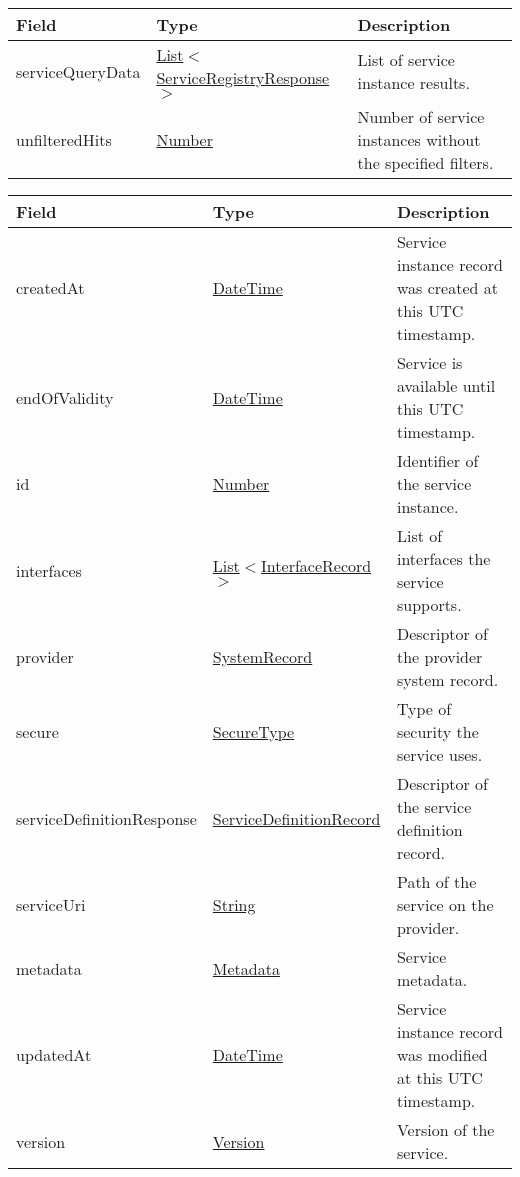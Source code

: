 \documentclass[a4paper]{arrowhead}
\newcommand{\pref}[1]{{\textcolor{ArrowheadGrey}{\hyperref[sec:model:primitives:#1]{#1}}}}
\begin{document}
\label{sec:model:ServiceQueryResult}

\begin{table}[ht!]
\begin{tabularx}{\textwidth}{| p{3cm} | p{6cm} | X |} \hline
\rowcolor{gray!33} Field & Type      & Description \\ \hline
serviceQueryData & \pref{List}$<$\hyperref[sec:model:ServiceRegistryResponse]{ServiceRegistryResponse}$>$     & List of service instance results. \\ \hline
unfilteredHits & \pref{Number} & Number of service instances without the specified filters. \\ \hline
\end{tabularx}
\end{table}

\label{sec:model:ServiceRegistryResponse}

\begin{table}[ht!]
\begin{tabularx}{\textwidth}{| p{4.25cm} | p{4cm} | X |} \hline
\rowcolor{gray!33} Field & Type      & Description \\ \hline
createdAt & \pref{DateTime} & Service instance record was created at this UTC timestamp. \\ \hline
endOfValidity & \pref{DateTime} & Service is available until this UTC timestamp. \\ \hline
id & \pref{Number} & Identifier of the service instance. \\ \hline
interfaces & \pref{List}$<$\hyperref[sec:model:InterfaceRecord]{InterfaceRecord}$>$ & List of interfaces the service supports. \\ \hline
provider & \hyperref[sec:model:SystemRecord]{SystemRecord} & Descriptor of the provider system record. \\ \hline
secure &\pref{SecureType}  & Type of security the service uses. \\ \hline
serviceDefinitionResponse & \hyperref[sec:model:ServiceDefinitionRecord]{ServiceDefinitionRecord} & Descriptor of the service definition record. \\ \hline
serviceUri & \pref{String} & Path of the service on the provider. \\ \hline
metadata & \hyperref[sec:model:Metadata]{Metadata}  & Service metadata. \\ \hline
updatedAt & \pref{DateTime} & Service instance record was modified at this UTC timestamp. \\ \hline
version &\pref{Version}     & Version of the service. \\ \hline
\end{tabularx}
\end{table}
\end{document}
